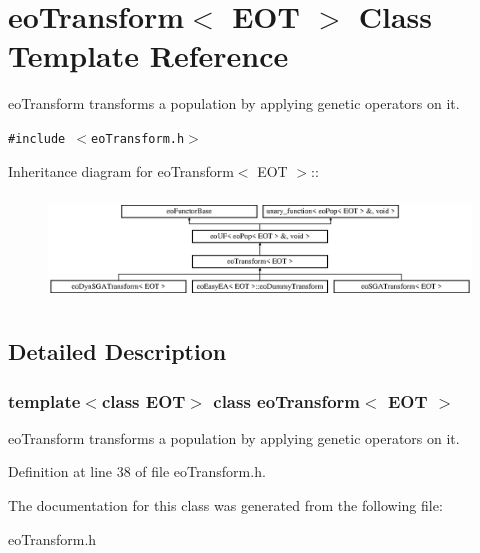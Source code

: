 \section{eo\-Transform$<$ EOT $>$ Class Template Reference}
\label{classeo_transform}
eo\-Transform transforms a population by applying genetic operators on it.  


{\tt \#include $<$eo\-Transform.h$>$}

Inheritance diagram for eo\-Transform$<$ EOT $>$::\begin{figure}[H]
\begin{center}
\leavevmode
\includegraphics[height=2.86079cm]{classeo_transform}
\end{center}
\end{figure}


\subsection{Detailed Description}
\subsubsection*{template$<$class EOT$>$ class eo\-Transform$<$ EOT $>$}

eo\-Transform transforms a population by applying genetic operators on it. 



Definition at line 38 of file eo\-Transform.h.

The documentation for this class was generated from the following file:\begin{CompactItemize}
\item 
eo\-Transform.h\end{CompactItemize}
